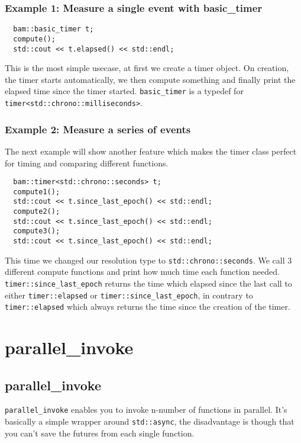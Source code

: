 \documentclass[11pt, a4paper]{article}
\begin{document}
\subsubsection{Example 1: Measure a single event with basic\_timer}
\begin{lstlisting}
  bam::basic_timer t;
  compute();
  std::cout << t.elapsed() << std::endl;
\end{lstlisting}

This is the most simple usecase, at first we create a timer object. On creation, the timer starts automatically, we then compute something and finally print the elapsed time since the timer started. \texttt{basic\_timer} is a typedef for \texttt{timer<std::chrono::milliseconds>}.
\subsubsection{Example 2: Measure a series of events}
The next example will show another feature which makes the timer class perfect for timing and comparing different functions.

\begin{lstlisting}
  bam::timer<std::chrono::seconds> t;
  compute1();
  std::cout << t.since_last_epoch() << std::endl;
  compute2();
  std::cout << t.since_last_epoch() << std::endl;
  compute3();
  std::cout << t.since_last_epoch() << std::endl;
\end{lstlisting}

This time we changed our resolution type to \texttt{std::chrono::seconds}. We call 3 different compute functions and print how much time each function needed. \texttt{timer::since\_last\_epoch} returns the time which elapsed since the last call to either \texttt{timer::elapsed} or \texttt{timer::since\_last\_epoch}, in contrary to \texttt{timer::elapsed} which always returns the time since the creation of the timer.


\section{parallel\_invoke}
\subsection{parallel\_invoke}

\texttt{parallel\_invoke} enables you to invoke n-number of functions in parallel. It's basically a simple wrapper around \texttt{std::async}, the disadvantage is though that you can't save the futures from each single function.
\end{document}

